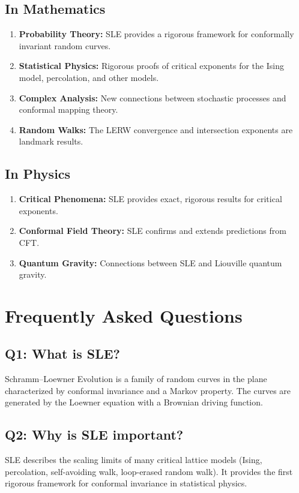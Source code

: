\subsection{In Mathematics}

\begin{enumerate}
    \item \textbf{Probability Theory:} SLE provides a rigorous framework for conformally invariant random curves.
    \item \textbf{Statistical Physics:} Rigorous proofs of critical exponents for the Ising model, percolation, and other models.
    \item \textbf{Complex Analysis:} New connections between stochastic processes and conformal mapping theory.
    \item \textbf{Random Walks:} The LERW convergence and intersection exponents are landmark results.
\end{enumerate}

\subsection{In Physics}

\begin{enumerate}
    \item \textbf{Critical Phenomena:} SLE provides exact, rigorous results for critical exponents.
    \item \textbf{Conformal Field Theory:} SLE confirms and extends predictions from CFT.
    \item \textbf{Quantum Gravity:} Connections between SLE and Liouville quantum gravity.
\end{enumerate}

\section{Frequently Asked Questions}

\subsection*{Q1: What is SLE?}
Schramm--Loewner Evolution is a family of random curves in the plane characterized by conformal invariance and a Markov property. The curves are generated by the Loewner equation with a Brownian driving function.

\subsection*{Q2: Why is SLE important?}
SLE describes the scaling limits of many critical lattice models (Ising, percolation, self-avoiding walk, loop-erased random walk). It provides the first rigorous framework for conformal invariance in statistical physics.

